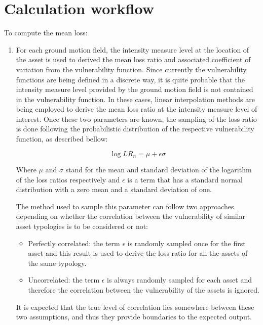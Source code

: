 \section{Calculation workflow}

To compute the mean loss:

\begin{enumerate}
\item For each ground motion field, the intensity measure level at the location of the asset is used to derived the mean loss ratio and associated coefficient of variation from the vulnerability function. Since currently the vulnerability functions are being defined in a discrete way, it is quite probable that the intensity measure level provided by the ground motion field is not contained in the vulnerability function. In these cases, linear interpolation methods are being employed to derive the mean loss ratio at the intensity measure level of interest. Once these two parameters are known, the sampling of the loss ratio is done following the probabilistic distribution of the respective vulnerability function, as described bellow:

\begin{equation}
\log{LR_n} = \mu + \epsilon\sigma
\end{equation}

Where $\mu$ and $\sigma$ stand for the mean and standard deviation of the logarithm of the loss ratios respectively and $\epsilon$ is a term that has a standard normal distribution with a zero mean and a standard deviation of one.  

The method used to sample this parameter can follow two approaches depending on whether the correlation between the vulnerability of similar asset typologies is to be considered or not:

\begin{itemize}

\item Perfectly correlated: the term $\epsilon$ is randomly sampled once for the first asset and this result is used to derive the loss ratio for all the assets of the same typology. 

\item Uncorrelated: the term $\epsilon$ is always randomly sampled for each asset and therefore the correlation between the vulnerability of the assets is ignored.

\end{itemize}

It is expected that the true level of correlation lies somewhere between these two assumptions, and thus they provide boundaries to the expected output. 



\end{enumerate}
